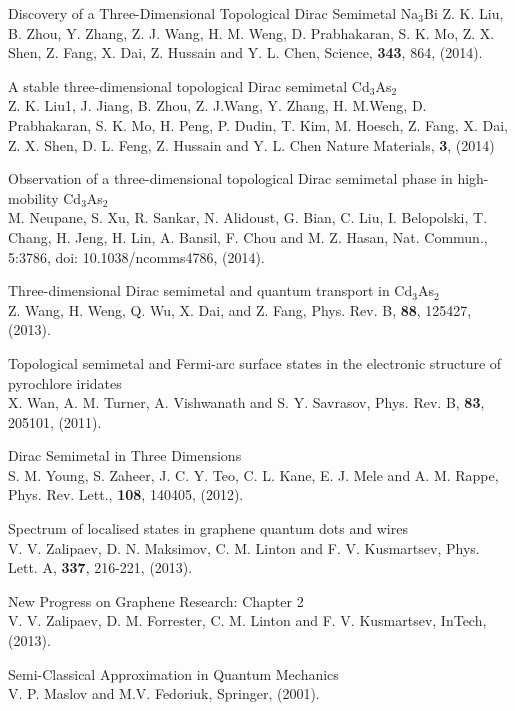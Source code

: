 \documentclass[12pt,a4paper]{report}
\begin{document}
\begin{thebibliography}{10}
 Discovery of a Three-Dimensional Topological Dirac Semimetal Na$_{3}$Bi
Z. K. Liu, B. Zhou, Y. Zhang, Z. J. Wang, H. M. Weng, D. Prabhakaran, S. K. Mo, Z. X. Shen, Z. Fang, X. Dai, Z. Hussain and Y. L. Chen,
Science, {\bf 343}, 864, (2014).

 A stable three-dimensional topological Dirac semimetal Cd$_{3}$As$_{2}$\\
Z. K. Liu1, J. Jiang, B. Zhou, Z. J.Wang, Y. Zhang, H. M.Weng, D. Prabhakaran, S. K. Mo, H. Peng, P. Dudin, T. Kim, M. Hoesch, Z. Fang, X. Dai, Z. X. Shen, D. L. Feng, Z. Hussain and Y. L. Chen
Nature Materials, {\bf 3}, (2014)

Observation of a three-dimensional topological Dirac semimetal phase in high-mobility Cd$_{3}$As$_{2}$\\
M. Neupane, S. Xu, R. Sankar, N. Alidoust, G. Bian, C. Liu, I. Belopolski, T. Chang, H. Jeng, H. Lin, A. Bansil, F. Chou and M. Z. Hasan,
Nat. Commun., 5:3786, doi: 10.1038/ncomms4786, (2014).

Three-dimensional Dirac semimetal and quantum transport in Cd$_{3}$As$_{2}$\\
Z. Wang, H. Weng, Q. Wu, X. Dai, and Z. Fang,
Phys. Rev. B, {\bf 88}, 125427, (2013).

 Topological semimetal and Fermi-arc surface states in the electronic structure of pyrochlore iridates\\
X. Wan, A. M. Turner, A. Vishwanath and S. Y. Savrasov,
Phys. Rev. B, {\bf 83}, 205101, (2011).

 Dirac Semimetal in Three Dimensions\\
S. M. Young, S. Zaheer, J. C. Y. Teo, C. L. Kane, E. J. Mele and A. M. Rappe,
Phys. Rev. Lett., {\bf 108}, 140405, (2012).

 Spectrum of localised states in graphene quantum dots and wires\\
V. V. Zalipaev, D. N. Maksimov, C. M. Linton and F. V. Kusmartsev,
Phys. Lett. A, {\bf 337}, 216-221, (2013).

New Progress on Graphene Research: Chapter 2\\
V. V. Zalipaev, D. M. Forrester, C. M. Linton and F. V. Kusmartsev,
InTech, (2013).

 Semi-Classical Approximation in Quantum Mechanics\\
V. P. Maslov and M.V. Fedoriuk,
Springer, (2001).


\end{thebibliography}
\end{document}
